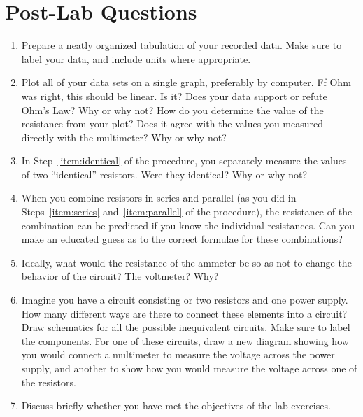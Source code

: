 \documentclass[12pt]{article}
\begin{document}
\newpage

\section*{Post-Lab Questions}

\begin{enumerate}
\item Prepare a neatly organized tabulation of your recorded data.
  Make sure to label your data, and include units where appropriate.  
\item Plot all of your data sets on a single graph, preferably by
  computer.  Ff Ohm was right, this should be linear.  Is it?  Does
  your data support or refute Ohm's Law?  Why or why not?  How do you
  determine the value of the resistance from your plot?  Does it agree
  with the values you measured directly with the multimeter?  Why or
  why not?
\item In Step~\ref{item:identical} of the procedure, you separately
  measure the values of two ``identical'' resistors.  Were they
  identical?  Why or why not?
\item When you combine resistors in series and parallel (as you did in
  Steps~\ref{item:series} and~\ref{item:parallel} of the procedure),
  the resistance of the combination can be predicted if you know the
  individual resistances.  Can you make an educated guess as to the
  correct formulae for these combinations?
\item Ideally, what would the resistance of the ammeter be so as not
  to change the behavior of the circuit?  The voltmeter?  Why?
\item Imagine you have a circuit consisting or two resistors and one
  power supply.  How many different ways are there to connect these
  elements into a circuit?  Draw schematics for all the possible
  inequivalent circuits.  Make sure to label the components.  For one
  of these circuits, draw a new diagram showing how you would connect
  a multimeter to measure the voltage across the power supply, and
  another to show how you would measure the voltage across one of the
  resistors.
\item Discuss briefly whether you have met the objectives of the lab
  exercises.  
\end{enumerate}
\end{document}
